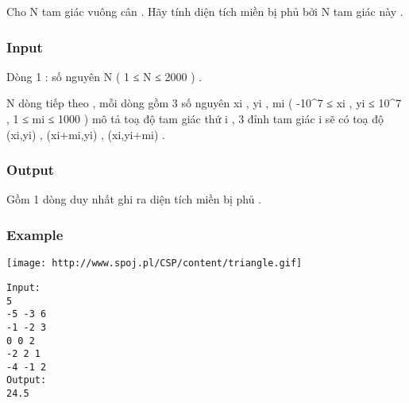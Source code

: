 



   Cho N tam giác vuông cân . Hãy tính diện tích miền bị phủ bởi N tam giác này .  

\subsubsection{   Input  }

   Dòng 1 : số nguyên N ( 1 ≤ N ≤ 2000 ) .   


   N dòng tiếp theo , mỗi dòng gồm 3 số nguyên xi , yi , mi (  -10^7 ≤ xi , yi ≤ 10^7 , 1 ≤ mi  ≤ 1000 ) mô tả toạ độ tam giác thứ i , 3 đỉnh tam giác i sẽ có toạ độ (xi,yi) , (xi+mi,yi) , (xi,yi+mi) .  

\subsubsection{   Output  }

   Gồm 1 dòng duy nhất ghi ra diện tích miền bị phủ .  

\subsubsection{   Example  }
\texttt{[image: http://www.spoj.pl/CSP/content/triangle.gif]}
\begin{verbatim}
Input:
5
-5 -3 6
-1 -2 3
0 0 2
-2 2 1
-4 -1 2
Output:
24.5
\end{verbatim}
